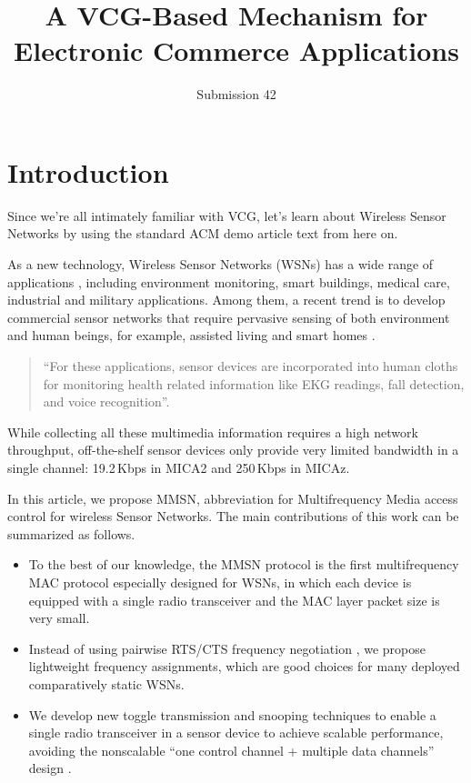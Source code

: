 \documentclass[format=acmsmall, review=false]{acmart}
\title[A VCG-Based Mechanism for Electronic Commerce]{A VCG-Based Mechanism for Electronic Commerce Applications}
\author{Submission 42}
\begin{document}
\begin{titlepage}

\maketitle

\vspace{1cm}
\setcounter{tocdepth}{2} %
\tableofcontents

\end{titlepage}

\section{Introduction}

Since we're all intimately familiar with VCG, let's learn about Wireless Sensor Networks by using the standard ACM demo article text from here on.

As a new technology, Wireless Sensor Networks (WSNs) has a wide
range of applications \cite{Culler-01, Bahl-02, Akyildiz-01}, including
environment monitoring, smart buildings, medical care, industrial and
military applications. Among them, a recent trend is to develop
commercial sensor networks that require pervasive sensing of both
environment and human beings, for example, assisted living
\cite{Akyildiz-02, Harvard-01,CROSSBOW} and smart homes
\cite{Harvard-01, Adya-01,CROSSBOW}.
\begin{quote}
	``For these applications, sensor devices are incorporated into human
	cloths \cite{Natarajan-01, Zhou-06, Bahl-02, Adya-01} for monitoring
	health related information like EKG readings, fall detection, and
	voice recognition''.
\end{quote}
While collecting all these multimedia information
\cite{Akyildiz-02} requires a high network throughput, off-the-shelf
sensor devices only provide very limited bandwidth in a single
channel: 19.2\,Kbps in MICA2 \cite{Bahl-02} and 250\,Kbps in MICAz.

In this article, we propose MMSN, abbreviation for Multifrequency
Media access control for wireless Sensor Networks. The main
contributions of this work can be summarized as follows.
\begin{itemize}
	\item To the best of our knowledge, the MMSN protocol is the first
	multifrequency MAC protocol especially designed for WSNs, in which
	each device is equipped with a single radio transceiver and
	the MAC layer packet size is very small.
	\item Instead of using pairwise RTS/CTS frequency negotiation
	\cite{Adya-01, Culler-01, Tzamaloukas-01, Zhou-06},
	we propose lightweight frequency assignments, which are good choices
	for many deployed comparatively static WSNs.
	\item We develop new toggle transmission and snooping techniques to
	enable a single radio transceiver in a sensor device to achieve
	scalable performance, avoiding the nonscalable ``one
	control channel + multiple data channels'' design \cite{Natarajan-01}.
\end{itemize}
\end{document}
